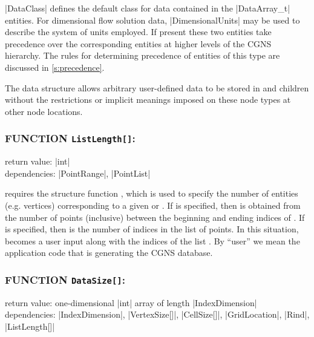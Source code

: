 |DataClass| defines the default class for data contained in the
|DataArray_t| entities.  For dimensional flow solution data,
|DimensionalUnits| may be used to describe the system of units employed.
If present these two entities take precedence over the corresponding entities
at higher levels of the CGNS hierarchy.  The rules for determining precedence
of entities of this type are discussed in \autoref{s:precedence}.

The  data structure allows arbitrary
user-defined data to be stored in  and
 children without the restrictions or implicit
meanings imposed on these node types at other node locations.

\begin{changes}
\subsubsection*{FUNCTION \texttt{ListLength[]}:}

\noindent return value: |int| \\
\noindent dependencies: |PointRange|, |PointList|

 requires the structure function , which
is used to specify the number of entities (e.g. vertices) corresponding to a
given  or . If
 is specified, then  is obtained from
the number of points (inclusive) between the beginning and ending indices of
. If  is specified, then
 is the number of indices in the list of points. In this
situation,  becomes a user input along with the indices of the
list . By ``user'' we mean the application code that is
generating the CGNS database.
\end{changes}

\subsubsection*{FUNCTION \texttt{DataSize[]}:}

\noindent return value: one-dimensional |int| array of length
                        |IndexDimension| \\
\noindent dependencies: |IndexDimension|, |VertexSize[]|, |CellSize[]|,
                        |GridLocation|, |Rind|, |ListLength[]|

